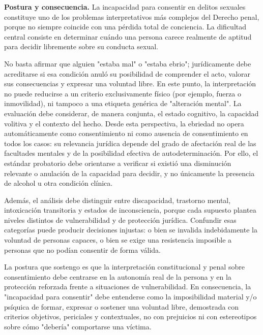 \documentclass[
	spanish,
	letterpaper, oneside
]{article}
\begin{document}
\textbf{Postura y consecuencia.} La incapacidad para consentir en delitos sexuales constituye uno de los problemas interpretativos más complejos del Derecho penal, porque no siempre coincide con una pérdida total de conciencia. La dificultad central consiste en determinar cuándo una persona carece realmente de aptitud para decidir libremente sobre su conducta sexual.

No basta afirmar que alguien "estaba mal" o "estaba ebrio"; jurídicamente debe acreditarse si esa condición anuló su posibilidad de comprender el acto, valorar sus consecuencias y expresar una voluntad libre. En este punto, la interpretación no puede reducirse a un criterio exclusivamente físico (por ejemplo, fuerza o inmovilidad), ni tampoco a una etiqueta genérica de "alteración mental". La evaluación debe considerar, de manera conjunta, el estado cognitivo, la capacidad volitiva y el contexto del hecho. Desde esta perspectiva, la ebriedad no opera automáticamente como consentimiento ni como ausencia de consentimiento en todos los casos: su relevancia jurídica depende del grado de afectación real de las facultades mentales y de la posibilidad efectiva de autodeterminación. Por ello, el estándar probatorio debe orientarse a verificar si existió una disminución relevante o anulación de la capacidad para decidir, y no únicamente la presencia de alcohol u otra condición clínica.

Además, el análisis debe distinguir entre discapacidad, trastorno mental, intoxicación transitoria y estados de inconsciencia, porque cada supuesto plantea niveles distintos de vulnerabilidad y de protección jurídica. Confundir esas categorías puede producir decisiones injustas: o bien se invalida indebidamente la voluntad de personas capaces, o bien se exige una resistencia imposible a personas que no podían consentir de forma válida.

La postura que sostengo es que la interpretación constitucional y penal sobre consentimiento debe centrarse en la autonomía real de la persona y en la protección reforzada frente a situaciones de vulnerabilidad. En consecuencia, la "incapacidad para consentir" debe entenderse como la imposibilidad material y/o psíquica de formar, expresar o sostener una voluntad libre, demostrada con criterios objetivos, periciales y contextuales, no con prejuicios ni con estereotipos sobre cómo "debería" comportarse una víctima.
\end{document}
